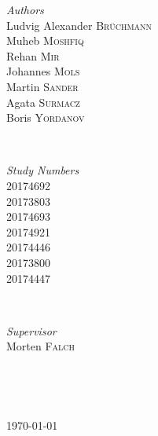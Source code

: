\documentclass[12p]{article}
\begin{document}
\begin{titlepage}
  \begin{minipage}{0.4\textwidth}
  \begin{flushleft} \large
  \emph{Authors}\\
    Ludvig Alexander \textsc{Brüchmann} \\
    Muheb \textsc{Moshfiq} \\
  	Rehan \textsc{Mir} \\
  	Johannes \textsc{Mols} \\
  	Martin \textsc{Sander} \\
  	Agata \textsc{Surmacz} \\
  	Boris \textsc{Yordanov} \\
  \end{flushleft}
  \end{minipage}
  ~
  \begin{minipage}{0.4\textwidth}
  \begin{flushright} \large
  \emph{Study Numbers} \\
    20174692 \\
    20173803 \\
    20174693 \\
    20174921 \\
    20174446 \\
    20173800 \\
    20174447 \\
  \end{flushright}
  \end{minipage}\\[0.5cm]
  
  
  \begin{minipage}{0.4\textwidth}
  \begin{flushleft} \large
  \emph{Supervisor}\\
    Morten \textsc{Falch} \\
  \end{flushleft}
  \end{minipage}
  ~
  \begin{minipage}{0.4\textwidth}
  \begin{flushright} \large
  \end{flushright}
  \end{minipage}\\[0.5cm]

	
	\vfill\vfill\vfill %
	
	{\large\today} %
	
\end{titlepage}
\end{document}

